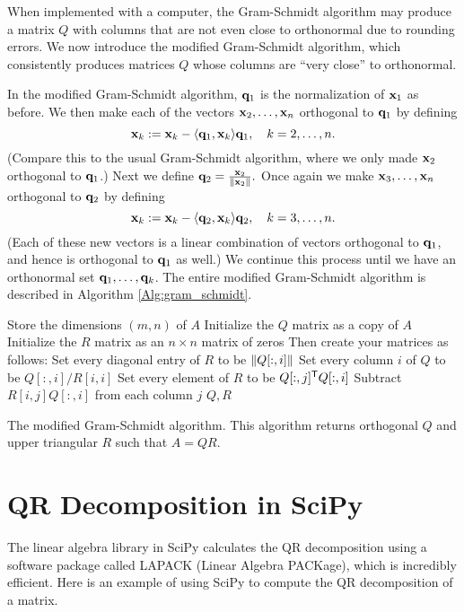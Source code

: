When implemented with a computer, the Gram-Schmidt algorithm may produce a matrix $Q$ with columns that are not even close to orthonormal due to rounding errors. 
We now introduce the modified Gram-Schmidt algorithm, which consistently produces matrices $Q$ whose columns are ``very close'' to orthonormal.

In the modified Gram-Schmidt algorithm, ${\bf q}_1$ is the normalization of ${\bf x}_1$ as before. 
We then make each of the vectors ${\bf x}_2, \ldots, {\bf x}_n$ orthogonal to ${\bf q}_1$ by defining
\[
{\bf x}_k := {\bf x}_k - \langle {\bf q}_1,{\bf x}_{k} \rangle {\bf q}_1,\quad k=2,\ldots,n.
\]
(Compare this to the usual Gram-Schmidt algorithm, where we only made ${\bf x}_2$ orthogonal to ${\bf q}_1$.) 
Next we define ${\bf q}_2 = \frac{{\bf x}_2}{\|{\bf x}_2\|}.$ Once again we make ${\bf x}_3, \ldots, {\bf x}_n$ orthogonal to ${\bf q}_2$ by defining
\[
{\bf x}_k := {\bf x}_k - \langle {\bf q}_2,{\bf x}_{k} \rangle {\bf q}_2,\quad k=3,\ldots,n.
\]
(Each of these new vectors is a linear combination of vectors orthogonal to ${\bf q}_1$, and hence is orthogonal to ${\bf q}_1$ as well.) 
We continue this process until we have an orthonormal set ${\bf q}_1, \ldots, {\bf q}_k$. 
The entire modified Gram-Schmidt algorithm is described in Algorithm \ref{Alg:gram_schmidt}.

\begin{algorithm}
\begin{algorithmic}[1]
\State Store the dimensions $(m,n)$ of $A$
\State Initialize the $Q$ matrix as a copy of $A$
\State Initialize the $R$ matrix as an $n\times n$ matrix of zeros
\State Then create your matrices as follows:
    \State Set every diagonal entry of $R$ to be $\left\lVert Q[:,i]\right\rVert$
    \State Set every column $i$ of $Q$ to be $ Q[:,i]/R[i,i]$
        \State Set every element of $R$ to be $Q[:,j]^{\mathsf T}  Q[:,i]$
        \State Subtract $R[i,j]Q[:,i]$ from each column $j$
	\EndFor
\EndFor
\State {} $Q, R$
\EndProcedure
\end{algorithmic}
\caption{The modified Gram-Schmidt algorithm. This algorithm returns orthogonal $Q$ and upper triangular $R$ such that $A = QR$.}
\label{Alg:gram_schmidt}
\end{algorithm}


\section*{QR Decomposition in SciPy}
The linear algebra library in SciPy calculates the QR decomposition using a software package called LAPACK (Linear Algebra PACKage), which is incredibly efficient.
Here is an example of using SciPy to compute the QR decomposition of a matrix.

